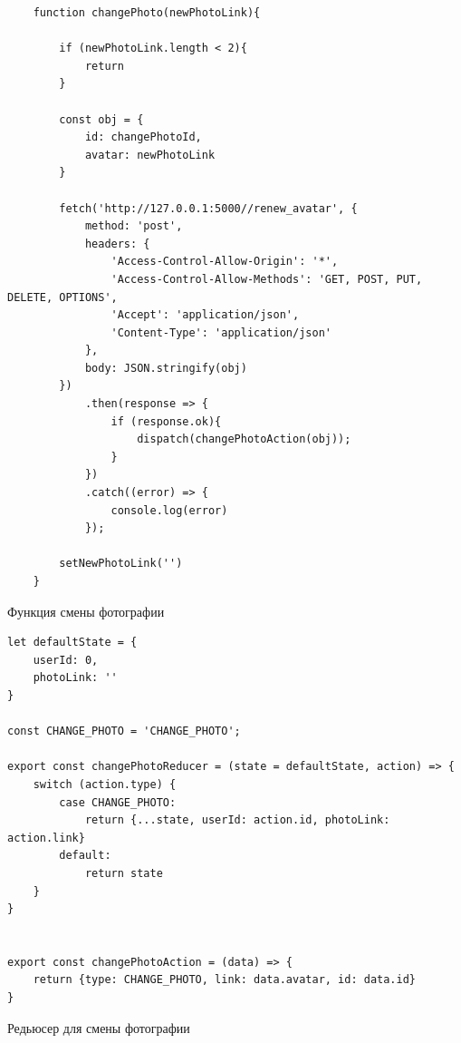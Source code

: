 \documentclass[14pt,final]{report}
\begin{document}
\begin{listing}[!h]
\begin{verbatim}
    function changePhoto(newPhotoLink){

        if (newPhotoLink.length < 2){
            return
        }

        const obj = {
            id: changePhotoId,
            avatar: newPhotoLink
        }

        fetch('http://127.0.0.1:5000//renew_avatar', {
            method: 'post',
            headers: {
                'Access-Control-Allow-Origin': '*',
                'Access-Control-Allow-Methods': 'GET, POST, PUT, DELETE, OPTIONS',
                'Accept': 'application/json',
                'Content-Type': 'application/json'
            },
            body: JSON.stringify(obj)
        })
            .then(response => {
                if (response.ok){
                    dispatch(changePhotoAction(obj));
                }
            })
            .catch((error) => {
                console.log(error)
            });

        setNewPhotoLink('')
    }
\end{verbatim}
\caption{Функция смены фотографии}
\label{changePhoto}
\end{listing}

\begin{listing}[!h]
\begin{verbatim}
let defaultState = {
    userId: 0,
    photoLink: ''
}

const CHANGE_PHOTO = 'CHANGE_PHOTO';

export const changePhotoReducer = (state = defaultState, action) => {
    switch (action.type) {
        case CHANGE_PHOTO:
            return {...state, userId: action.id, photoLink: action.link}
        default:
            return state
    }
}


export const changePhotoAction = (data) => {
    return {type: CHANGE_PHOTO, link: data.avatar, id: data.id}
}

\end{verbatim}
\caption{Редьюсер для смены фотографии}
\label{changePhotoReducer}
\end{listing}
\end{document}
